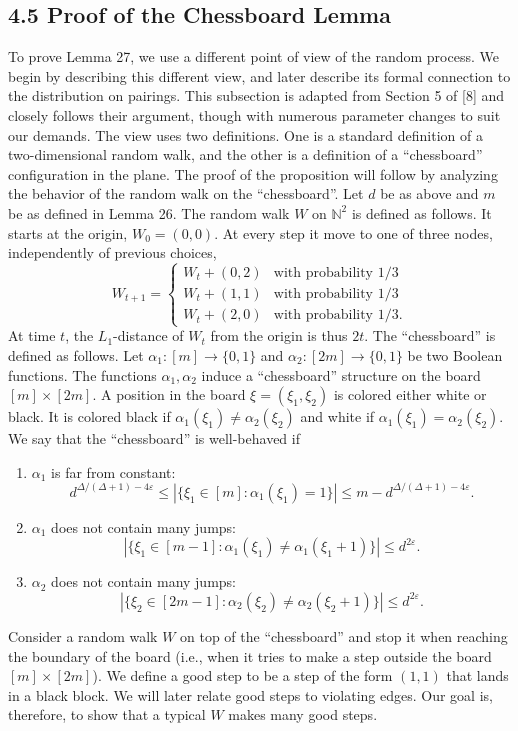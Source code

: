 \documentclass[10pt,a4paper]{article}
\begin{document}
\subsection*{4.5 Proof of the Chessboard Lemma}
To prove Lemma 27, we use a different point of view of the random process. We begin by describing this different view, and later describe its formal connection to the distribution on pairings. This subsection is adapted from Section 5 of [8] and closely follows their argument, though with numerous parameter changes to suit our demands.
The view uses two definitions. One is a standard definition of a two-dimensional random walk, and the other is a definition of a ``chessboard'' configuration in the plane. The proof of the proposition will follow by analyzing the behavior of the random walk on the ``chessboard''. Let $d$ be as above and $m$ be as defined in Lemma 26. The random walk $W$ on $\mathbb N^2$ is defined as follows. It starts at the origin, $W_0=(0,0)$. At every step it move to one of three nodes, independently of previous choices,
\[W_{t+1}=\begin{cases}W_t+(0,2)&\text{with probability }1/3\\W_t+(1,1)&\text{with probability }1/3\\W_t+(2,0)&\text{with probability }1/3.\end{cases}\]
At time $t$, the $L_1$-distance of $W_t$ from the origin is thus $2t$.
The ``chessboard'' is defined as follows. Let $\alpha_1:[m]\to\{0,1\}$ and $\alpha_2:[2m]\to\{0,1\}$ be two Boolean functions. The functions $\alpha_1,\alpha_2$ induce a ``chessboard'' structure on the board $[m]\times[2m]$. A position in the board $\xi=(\xi_1,\xi_2)$ is colored either white or black. It is colored black if $\alpha_1(\xi_1)\neq\alpha_2(\xi_2)$ and white if $\alpha_1(\xi_1)=\alpha_2(\xi_2)$. We say that the ``chessboard'' is well-behaved if
\begin{enumerate}
\item $\alpha_1$ is far from constant:
\[d^{\Delta/(\Delta+1)-4\varepsilon}\leq|\{\xi_1\in[m]:\alpha_1(\xi_1)=1\}|\leq m-d^{\Delta/(\Delta+1)-4\varepsilon}.\]
\item $\alpha_1$ does not contain many jumps:
\[|\{\xi_1\in[m-1]:\alpha_1(\xi_1)\neq\alpha_1(\xi_1+1)\}|\leq d^{2\varepsilon}.\]
\item $\alpha_2$ does not contain many jumps:
\[|\{\xi_2\in[2m-1]:\alpha_2(\xi_2)\neq\alpha_2(\xi_2+1)\}|\leq d^{2\varepsilon}.\]
\end{enumerate}
Consider a random walk $W$ on top of the ``chessboard'' and stop it when reaching the boundary of the board (i.e., when it tries to make a step outside the board $[m]\times[2m]$). We define a good step to be a step of the form $(1,1)$ that lands in a black block. We will later relate good steps to violating edges. Our goal is, therefore, to show that a typical $W$ makes many good steps.
\end{document}
